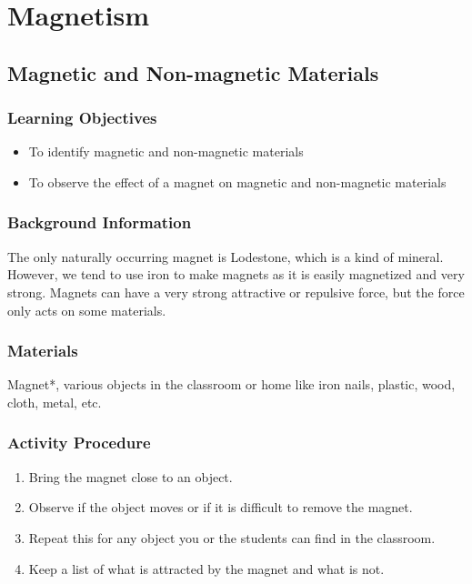 \section{Magnetism}


	
\subsection{Magnetic and Non-magnetic Materials}

\subsubsection*{Learning Objectives}
\begin{itemize}
\item{To identify magnetic and non-magnetic materials} 
\item{To observe the effect of a magnet on magnetic and non-magnetic materials} 
\end{itemize}

\subsubsection*{Background Information}
The only naturally occurring magnet is Lodestone, which is a kind of mineral. However, we tend to use iron to make magnets as it is easily magnetized and very strong. Magnets can have a very strong attractive or repulsive force, but the force only acts on some materials.

\subsubsection*{Materials}
Magnet*, various objects in the classroom or home like iron nails, plastic, wood, cloth, metal, etc.  


\subsubsection*{Activity Procedure}
\begin{enumerate}
\item{Bring the magnet close to an object.} 
\item{Observe if the object moves or if it is difficult to remove the magnet.} 
\item{Repeat this for any object you or the students can find in the classroom.} 
\item{Keep a list of what is attracted by the magnet and what is not.} 
\end{enumerate}

